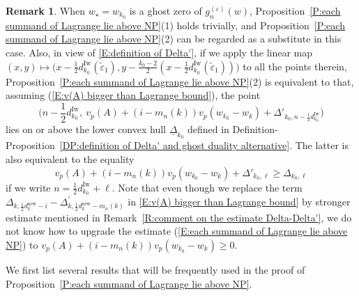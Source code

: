 \documentclass[12pt]{amsart}
\theoremstyle{definition}
\newtheorem{remark}[subsection]{Remark}
\numberwithin{equation}{subsection}
\newcommand{\new}{\mathrm{new}}
\newcommand{\Iw}{\mathrm{Iw}}
\begin{document}
\begin{remark}
\label{R:equivalent of proposition each summand of Lagrange lie above NP}
When $w_\star=w_{k_0}$ is a ghost zero of $g_n^{(\varepsilon)}(w)$, Proposition~\ref{P:each summand of Lagrange lie above NP}(1) holds trivially, and Proposition~\ref{P:each summand of Lagrange lie above NP}(2) can be regarded as a substitute in this case. Also, in view of \eqref{E:definition of Delta'}, if we apply the linear map $(x,y)\mapsto \big(x-\frac 12 d_{k_0}^\Iw(\tilde \varepsilon_1), y-\frac{k_0-2}2(x-\frac 12 d_{k_0}^\Iw(\tilde \varepsilon_1))\big)$ to all the points therein, Proposition~\ref{P:each summand of Lagrange lie above NP}(2) is equivalent to that, assuming (\ref{E:v(A) bigger than Lagrange bound}), the point 
\[
\Big(n-\frac 12 d_{k_0}^\Iw,\ v_p(A)+(i-m_n(k))v_p(w_{k_0}-w_k)+\Delta'_{k_0,n-\frac 12 d_{k_0}^\Iw} \Big)
\]
lies on or above the lower convex hull $\underline{\Delta}_{k_0}$ defined in Definition-Proposition~\ref{DP:definition of Delta' and ghost duality alternative}. The latter is also equivalent to the equality
\begin{equation}\label{E:each summand of Lagrange lie above NP}
	v_p(A)+(i-m_n(k))v_p(w_{k_0}-w_k)+\Delta'_{k_0,\ell}\geq \Delta_{k_0,\ell}
\end{equation}
if we write $n=\frac 12 d_{k_0}^\Iw+\ell$. Note that even though we replace the term $\Delta_{k,\frac 12 d_{k}^\new -i} - \Delta^{\prime}_{k, \frac 12 d_{k}^\mathrm{new}- m_n(k)}$ in \eqref{E:v(A) bigger than Lagrange bound} by stronger estimate mentioned in Remark~\ref{R:comment on the estimate Delta-Delta'}, we do not know how to upgrade the estimate (\ref{E:each summand of Lagrange lie above NP}) to $v_p(A)+(i-m_n(k))v_p(w_{k_0}-w_k)\geq 0$.
\end{remark}


We first list several results that will be frequently used in the proof of Proposition~\ref{P:each summand of Lagrange lie above NP}. 
\end{document}
